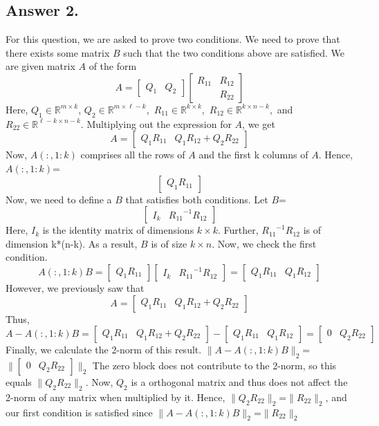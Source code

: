 \documentclass[12pt]{article}
\newcommand{\R}{\mathbb{R}}
\begin{document}
\subsection*{Answer 2.}
For this question, we are asked to prove two conditions. We need to prove that there exists some matrix $B$ such that the two conditions above are satisfied. We are given matrix $A$ of the form 
\[
    A = \begin{bmatrix}
        Q_1 & Q_2
    \end{bmatrix}
    \begin{bmatrix}
        R_{11} & R_{12} \\
               & R_{22}
    \end{bmatrix}
\]
Here, $Q_1\in\R^{m\times k}$, $Q_2\in\R^{m\times \ell-k},$ $R_{11}\in\R^{k\times k},$ $R_{12}\in\R^{k\times n-k},$ and $R_{22}\in\R^{\ell-k\times n-k}.$
Multiplying out the expression for $A$, we get
\[A = \begin{bmatrix}
        Q_1R_{11} & Q_1R_{12}+Q_2R_{22}
    \end{bmatrix}\]
Now, $A(:,1:k)$ comprises all the rows of $A$ and the first k columns of $A$. 
Hence, $A(:,1:k)$= \[\begin{bmatrix}Q_1R_{11}\end{bmatrix}\]
Now, we need to define a $B$ that satisfies both conditions. Let $B$=\[\begin{bmatrix}I_k & {R_{11}}^{-1}R_{12}\end{bmatrix}\]
Here, $I_k$ is the identity matrix of dimensions  $k \times k$. Further, ${R_{11}}^{-1}R_{12}$ is of dimension k*(n-k). As a result, $B$ is of size  $k \times n$.
Now, we check the first condition.  
\[
    A(:,1:k)B = \begin{bmatrix} Q_1R_{11} \end{bmatrix}
    \begin{bmatrix} I_k & {R_{11}}^{-1}R_{12} \end{bmatrix} = \begin{bmatrix} Q_1R_{11} & Q_1R_{12}\end{bmatrix}
\]
However, we previously saw that \[A = \begin{bmatrix}
        Q_1R_{11} & Q_1R_{12}+Q_2R_{22}
    \end{bmatrix}\]
Thus, \[
    A - A(:,1:k)B = \begin{bmatrix} Q_1R_{11} & Q_1R_{12}+Q_2R_{22}\end{bmatrix} - \begin{bmatrix} Q_1R_{11} & Q_1R_{12}\end{bmatrix} = \begin{bmatrix} 0 & Q_2R_{22}\end{bmatrix}
\]
Finally, we calculate the 2-norm of this result. 
$\|A - A(:,1:k)B\|_2$=$\|\begin{bmatrix} 0 & Q_2R_{22}\end{bmatrix}\|_2$
The zero block does not contribute to the 2-norm, so this equals $\|Q_2R_{22}\|_2$. Now, $Q_2$ is a orthogonal matrix and thus does not affect the 2-norm of any matrix when multiplied by it. Hence, $\|Q_2R_{22}\|_2$=$\|R_{22}\|_2$, and our first condition is satisfied since $\|A - A(:,1:k)B\|_2$=$\|R_{22}\|_2$
\end{document}
